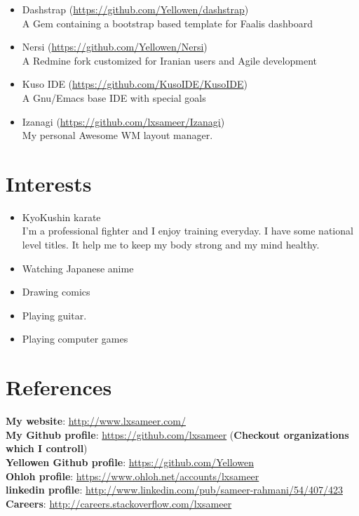 \documentclass[a4paper,11pt]{article}
\begin{document}
\begin{itemize}
\item Dashstrap (\url{https://github.com/Yellowen/dashstrap})\\
  A Gem containing a bootstrap based template for Faalis dashboard

\item Nersi (\url{https://github.com/Yellowen/Nersi})\\
  A Redmine fork customized for Iranian users and Agile development

\item Kuso IDE (\url{https://github.com/KusoIDE/KusoIDE})\\
  A Gnu/Emacs base IDE with special goals

\item Izanagi (\url{https://github.com/lxsameer/Izanagi})\\
  My personal Awesome WM layout manager.


\end{itemize}



\section*{Interests}
\begin{itemize}

\item KyoKushin karate\\
  I’m a professional fighter and I enjoy training everyday. I have some national
  level titles. It help me to keep my body strong and my mind healthy.

\item Watching Japanese anime
\item Drawing comics
\item Playing guitar.
\item Playing computer games
\end{itemize}

\section*{References}
\textbf{My website}: \url{http://www.lxsameer.com/}\\
\textbf{My Github profile}:  \url{https://github.com/lxsameer} (\textbf{Checkout organizations which I controll})\\
\textbf{Yellowen Github profile}: \url{https://github.com/Yellowen}\\
\textbf{Ohloh profile}: \url{https://www.ohloh.net/accounts/lxsameer}\\
\textbf{linkedin profile}: \url{http://www.linkedin.com/pub/sameer-rahmani/54/407/423}\\
\textbf{Careers}: \url{http://careers.stackoverflow.com/lxsameer}\\
\end{document}
